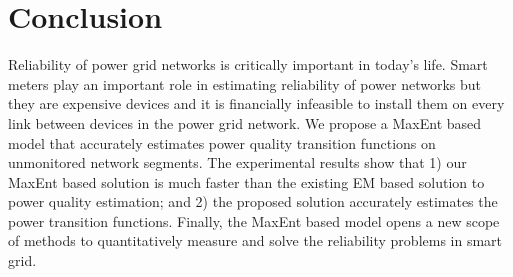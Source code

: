 
\section{Conclusion}
Reliability of power grid networks is critically important in today's life.  Smart meters play an important role in estimating reliability of power networks but they are expensive devices and it is financially infeasible to install them on every link between devices in the power grid network. We propose a MaxEnt based model that accurately estimates power quality transition functions on unmonitored network segments. The experimental results show that 1) our MaxEnt based solution is much faster than the existing EM based solution to power quality estimation; and 2) the proposed solution accurately estimates the power transition functions. Finally, the MaxEnt based model opens a new scope of methods to quantitatively measure and solve the reliability problems in smart grid.
